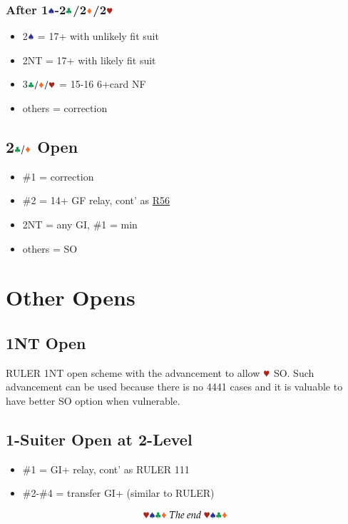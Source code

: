 \documentclass{article}
\begin{document}
\begin{multicols}{2}
\subsubsection{After 1$\sss$-2$\ccc$/2$\ddd$/2$\hhh$}\label{sec:1s-escape}
\begin{itemize}
    \item 2$\sss$ = 17+ with unlikely fit suit
    \item 2NT = 17+ with likely fit suit
    \item 3$\ccc/\ddd/\hhh$ = 15-16 6+card NF
    \item others = correction
\end{itemize}

\subsection{2$\ccc/\ddd$ Open}\label{sec:2cd}
\begin{itemize}
    \item \#1 = correction
    \item \#2 = 14+ GF relay, cont' as \hyperref[sec:nlm3r56]{R56}
    \item 2NT = any GI, \#1 = min
    \item others = SO
\end{itemize}

\section{Other Opens}
\subsection{1NT Open}\label{sec:1n}
RULER 1NT open scheme with the advancement to allow $\hhh$ SO. Such advancement can be used because there is no 4441 cases and it is valuable to have better SO option when vulnerable.

\subsection{1-Suiter Open at 2-Level}\label{sec:1suit}
\begin{itemize}
    \item \#1 = GI+ relay, cont' as RULER 111
    \item \#2-\#4 = transfer GI+ (similar to RULER)
\end{itemize}

$$\hhh\sss\ccc\ddd~The~end~\hhh\sss\ccc\ddd$$

\end{multicols}
\end{document}
